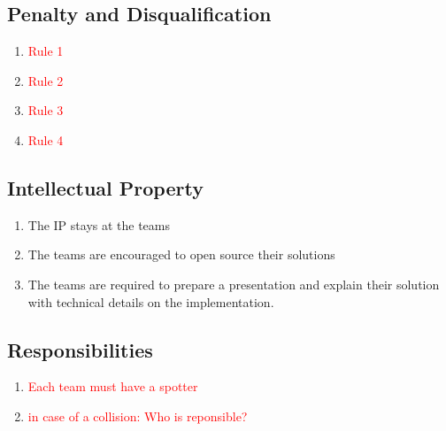 \subsection{Penalty and Disqualification}
\begin{enumerate}
	\item{\textcolor{red}{Rule 1}}
	\item{\textcolor{red}{Rule 2}}
	\item{\textcolor{red}{Rule 3}}
	\item{\textcolor{red}{Rule 4}}
\end{enumerate}

\subsection{Intellectual Property}
\begin{enumerate}
	\item{The IP stays at the teams}
	\item{The teams are encouraged to open source their solutions}
	\item{The teams are required to prepare a presentation and explain their solution with technical details on the implementation.}
\end{enumerate}

\subsection{Responsibilities}
\begin{enumerate}
	\item{\textcolor{red}{Each team must have a spotter}}
	\item{\textcolor{red}{in case of a collision: Who is reponsible? }}

\end{enumerate}
